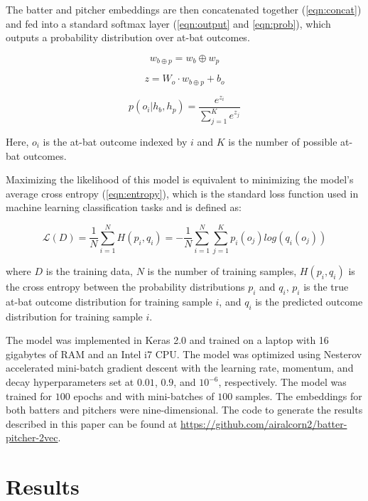 \documentclass{article}
\begin{document}
The batter and pitcher embeddings are then concatenated together (\ref{eqn:concat}) and fed into a standard softmax layer (\ref{eqn:output} and \ref{eqn:prob}), which outputs a probability distribution over at-bat outcomes.

\begin{equation}
\label{eqn:concat}
w_{b \oplus p} = w_b \oplus w_p
\end{equation}

\begin{equation}
\label{eqn:output}
z = W_o \cdot w_{b \oplus p} + b_o
\end{equation}

\begin{equation}
\label{eqn:prob}
p(o_i | h_b, h_p) = \frac{e^{z_i}}{\sum_{j=1}^{K} e^{z_j}}
\end{equation}

Here, $o_i$ is the at-bat outcome indexed by $i$ and $K$ is the number of possible at-bat outcomes.

Maximizing the likelihood of this model is equivalent to minimizing the model's average cross entropy (\ref{eqn:entropy}), which is the standard loss function used in machine learning classification tasks and is defined as:

\begin{equation}
\label{eqn:entropy}
\mathcal{L}(D) = \frac{1}{N}\sum_{i=1}^{N}H(p_i,q_i) = -\frac{1}{N}\sum_{i=1}^{N}\sum_{j=1}^{K} p_i(o_j)log(q_i(o_j))
\end{equation}

where $D$ is the training data, $N$ is the number of training samples, $H(p_i,q_i)$ is the cross entropy between the probability distributions $p_i$ and $q_i$, $p_i$ is the true at-bat outcome distribution for training sample $i$, and $q_i$ is the predicted outcome distribution for training sample $i$.

The model was implemented in Keras 2.0 \parencite{Keras2015} and trained on a laptop with 16 gigabytes of RAM and an Intel i7 CPU. The model was optimized using Nesterov accelerated mini-batch gradient descent with the learning rate, momentum, and decay hyperparameters set at $0.01$, $0.9$, and $10^{-6}$, respectively. The model was trained for $100$ epochs and with mini-batches of $100$ samples. The embeddings for both batters and pitchers were nine-dimensional. The code to generate the results described in this paper can be found at \url{https://github.com/airalcorn2/batter-pitcher-2vec}.

\section{Results}
\label{results}
\end{document}
